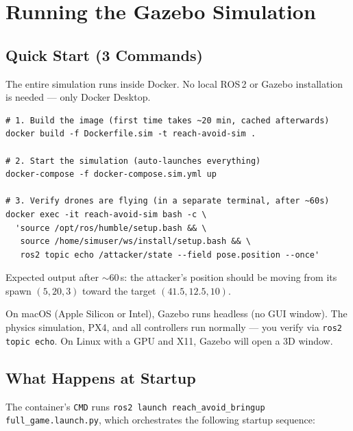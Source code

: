 \documentclass[11pt,a4paper]{article}
\begin{document}
\section{Running the Gazebo Simulation}

\subsection{Quick Start (3 Commands)}

The entire simulation runs inside Docker. No local ROS\,2 or Gazebo installation is needed --- only Docker Desktop.

\begin{lstlisting}[style=bashstyle]
# 1. Build the image (first time takes ~20 min, cached afterwards)
docker build -f Dockerfile.sim -t reach-avoid-sim .

# 2. Start the simulation (auto-launches everything)
docker-compose -f docker-compose.sim.yml up

# 3. Verify drones are flying (in a separate terminal, after ~60s)
docker exec -it reach-avoid-sim bash -c \
  'source /opt/ros/humble/setup.bash && \
   source /home/simuser/ws/install/setup.bash && \
   ros2 topic echo /attacker/state --field pose.position --once'
\end{lstlisting}

Expected output after $\sim$60\,s: the attacker's position should be moving from its spawn $(5, 20, 3)$ toward the target $(41.5, 12.5, 10)$.

\begin{warningbox}
On macOS (Apple Silicon or Intel), Gazebo runs headless (no GUI window). The physics simulation, PX4, and all controllers run normally --- you verify via \texttt{ros2 topic echo}. On Linux with a GPU and X11, Gazebo will open a 3D window.
\end{warningbox}

\subsection{What Happens at Startup}

The container's \texttt{CMD} runs \texttt{ros2 launch reach\_avoid\_bringup full\_game.launch.py}, which orchestrates the following startup sequence:
\end{document}
